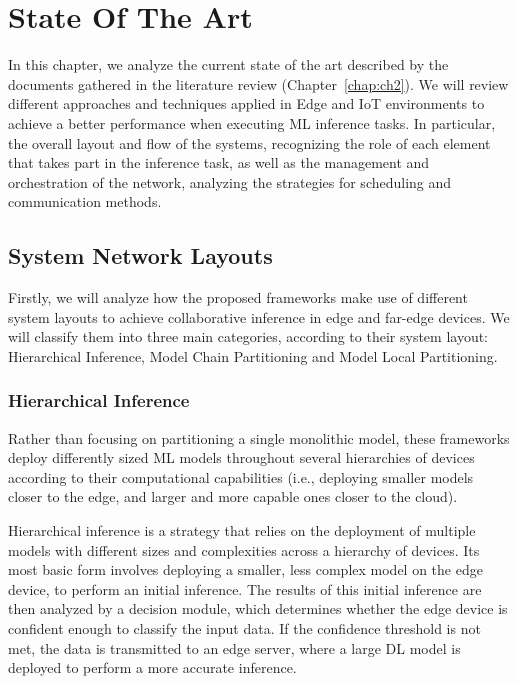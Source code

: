 \chapter{State Of The Art} \label{chap:ch3}

In this chapter, we analyze the current state of the art described
by the documents gathered in the literature review (Chapter~\ref{chap:ch2}).
We will review different approaches and techniques applied in Edge and \ac{IoT}
environments to achieve a better performance when executing \ac{ML} inference 
tasks. In particular,
the overall layout and flow of the systems, recognizing the role of each
element that takes part in the inference task, as well as the management and 
orchestration of the network, analyzing the strategies for scheduling and 
communication methods.

    
\section{System Network Layouts} \label{sec:se31}

Firstly, we will analyze how the proposed frameworks make use of different system 
layouts to achieve collaborative inference in edge and far-edge devices. We will
classify them into three main categories, according to their system layout:
Hierarchical Inference, Model Chain Partitioning and Model Local Partitioning.

\subsection{Hierarchical Inference} \label{sec:se311}

Rather than focusing on partitioning a single monolithic model, these
frameworks deploy differently sized \ac{ML} models throughout several
hierarchies of devices according to their computational capabilities (i.e.,
deploying smaller models closer to the edge, and larger and more capable
ones closer to the cloud).

Hierarchical inference is a strategy that relies on the deployment of multiple
models with different sizes and complexities across a hierarchy of devices. Its most
basic form involves deploying a smaller, less complex model on the edge device,
to perform an initial inference. The results of
this initial inference are then analyzed by a decision module, which determines
whether the edge device is confident enough to classify the input data. If the
confidence threshold is not met, the data is transmitted to an edge server, where a
large \ac{DL} model is deployed to perform a more accurate inference. 

